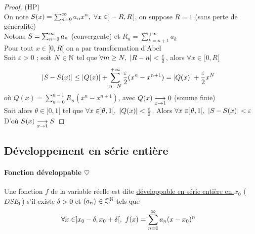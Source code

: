 		
		\begin{proof} (HP)\\
		On note $S(x) = \sum_{n=0}^\infty a_nx^n ,~\forall x\in ]-R,R[$, on suppose $R=1$ (sans perte de généralité)\\
		Notons $S=\sum_{n=0}^\infty a_n$ (convergente) et $R_n = \sum_{k=n+1}^{+\infty} a_k$\\
		Pour tout $x\in[0,R[$ on a par transformation d'Abel \vspace*{0.3cm}\\
		Soit $\varepsilon >0$ ; soit $N\in{\mathbb{N}}$ tel que $\forall m\geq N ,~\left\vert R-n \right\vert<\frac{\varepsilon}{2}$, alors $\forall x\in[0,R[$ 
		\[ \left\vert S-S(x) \right\vert \leq \left\vert Q(x) \right\vert + \sum_{n=N}^{+\infty} \frac{\varepsilon}{2} (x^n - x^{n+1}) = \left\vert Q(x) \right\vert + \frac{\varepsilon}{2} x^N \] 
		où $Q(x) = \sum_{n=0}^{n-1} R_n(x^n - x^{n+1})$, avec $Q(x) \underset{x \to 1}{\longrightarrow} 0$ (somme finie) \vspace*{0.2cm} \\
		Soit alors $\theta \in [0,1[$ tel que $\forall x\in ]\theta,1[ ,~ \left\vert Q(x) \right\vert <\frac{\varepsilon}{2}$. Alors $\forall x\in ]\theta,1[,~ \left\vert S-S(x) \right\vert <\varepsilon$ \vspace*{0.2cm} \\
		D'où $S(x) \underset{x \to 1}{\longrightarrow} S$
		\end{proof} \medskip
		
		
	\subsection{Développement en série entière}
		
		\vspace{-15pt}
		\traitd
		\paragraph{Fonction développable $\heartsuit$}
			Une fonction $f$ de la variable réelle est dite \uline{développable en série entière en $x_0$} ($DSE_0$) s'il existe $\delta>0$ et $(a_n)\in{\mathbb{C}}^{\mathbb{N}}$ tels que 
			\[ 
				\forall x\in ]x_0-\delta , x_0+\delta[ ,~ f(x) = \suminf a_n(x-x_0)^n 
			\vspace{-15pt}
			\]
		\trait
		
